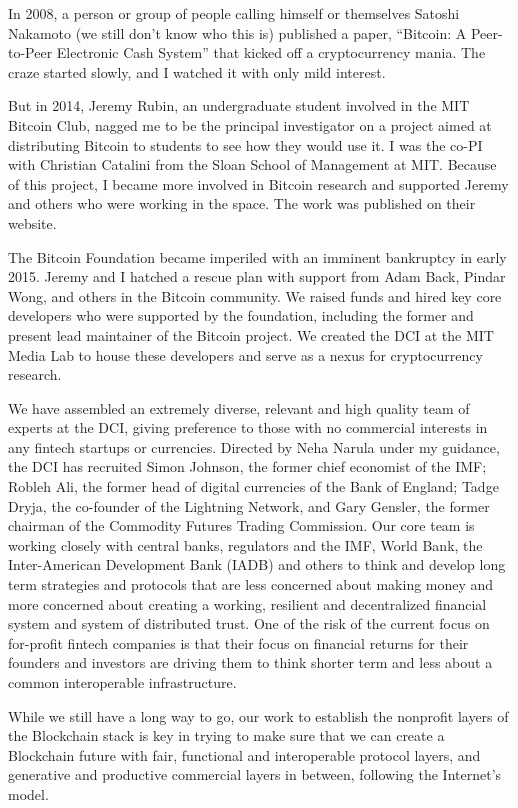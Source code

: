 In 2008, a person or group of people calling himself or themselves Satoshi Nakamoto (we still don't know who this is) published a paper, ``Bitcoin: A Peer-to-Peer Electronic Cash System'' \cite{nakamoto2008Bitcoin} that kicked off a cryptocurrency mania. The craze started slowly, and I watched it with only mild interest.

But in 2014, Jeremy Rubin, an undergraduate student involved in the MIT Bitcoin Club, nagged me to be the principal investigator on a project aimed at distributing Bitcoin to students to see how they would use it. I was the co-\ac{PI} with Christian Catalini from the Sloan School of Management at MIT. Because of this project, I became more involved in Bitcoin research and supported Jeremy and others who were working in the space. The work was published on their website.

The Bitcoin Foundation became imperiled with an imminent bankruptcy in early 2015. Jeremy and I hatched a rescue plan with support from Adam Back, Pindar Wong, and others in the Bitcoin community. We raised funds and hired key core developers who were supported by the foundation, including the former and present lead maintainer of the Bitcoin project. We created the \ac{DCI} at the MIT Media Lab to house these developers and serve as a nexus for cryptocurrency research.

We have assembled an extremely diverse, relevant and high quality team of experts at the \ac{DCI}, giving preference to those with no commercial interests in any fintech startups or currencies. Directed by Neha Narula under my guidance, the \ac{DCI} has recruited Simon Johnson, the former chief economist of the \ac{IMF}; Robleh Ali, the former head of digital currencies of the Bank of England; Tadge Dryja, the co-founder of the Lightning Network, and Gary Gensler, the former chairman of the Commodity Futures Trading Commission. Our core team is working closely with central banks, regulators and the \ac{IMF}, World Bank, the Inter-American Development Bank (IADB) and others to think and develop long term strategies and protocols that are less concerned about making money and more concerned about creating a working, resilient and decentralized financial system and system of distributed trust. One of the risk of the current focus on for-profit fintech companies is that their focus on financial returns for their founders and investors are driving them to think shorter term and less about a common interoperable infrastructure.

While we still have a long way to go, our work to establish the nonprofit layers of the Blockchain stack is key in trying to make sure that we can create a Blockchain future with fair, functional and interoperable protocol layers, and generative and productive commercial layers in between, following the Internet's model.

